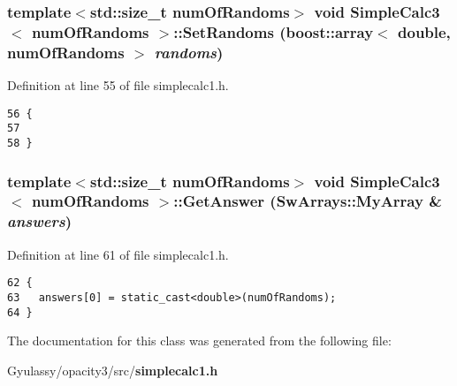 \subsubsection{\setlength{\rightskip}{0pt plus 5cm}template$<$std::size\_\-t numOfRandoms$>$ void {\bf SimpleCalc3}$<$ numOfRandoms $>$::SetRandoms (boost::array$<$ double, numOfRandoms $>$ {\em randoms})\hspace{0.3cm}{\tt  [inline]}}\label{classSimpleCalc3_e87134efa498b50cb86ba2a0827f5e11}




Definition at line 55 of file simplecalc1.h.

\begin{Code}\begin{verbatim}56 {
57 
58 }
\end{verbatim}
\end{Code}


\subsubsection{\setlength{\rightskip}{0pt plus 5cm}template$<$std::size\_\-t numOfRandoms$>$ void {\bf SimpleCalc3}$<$ numOfRandoms $>$::GetAnswer ({\bf SwArrays::MyArray} \& {\em answers})\hspace{0.3cm}{\tt  [inline]}}\label{classSimpleCalc3_ca9193e3aef081ac6558d909adf16bb7}




Definition at line 61 of file simplecalc1.h.

\begin{Code}\begin{verbatim}62 {
63   answers[0] = static_cast<double>(numOfRandoms);
64 }
\end{verbatim}
\end{Code}




The documentation for this class was generated from the following file:\begin{CompactItemize}
\item 
Gyulassy/opacity3/src/{\bf simplecalc1.h}\end{CompactItemize}
